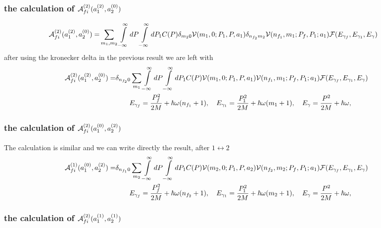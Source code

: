 \subsubsection{the calculation of $ {\cal A}_{fi}^{(2)}(a_1^{(2)}, a_2^{(0)})$}

\begin{align}
  {\cal A}_{fi}^{(2)}(a_1^{(2)}, a_2^{(0)}) = & \sum\limits_{m_1,m_2}\int\limits_{-\infty}^{\infty}dP\int\limits_{-\infty}^{\infty}dP_1 C(P)\delta_{m_20}{\cal V}(m_1,0;P_1,P,a_1)\delta_{n_{f_2}m_2}{\cal V}(n_{f_1},m_1;P_f,P_1;a_1){\cal F}(E_{\gamma_f},E_{\gamma_1},E_\gamma)
\end{align}
after using the kronecker delta in the previous result we are left with
\begin{align}
  {\cal A}_{fi}^{(2)}(a_1^{(2)}, a_2^{(0)}) = & \delta_{n_{f_2}0}\sum\limits_{m_1}\int\limits_{-\infty}^{\infty}dP\int\limits_{-\infty}^{\infty}dP_1 C(P){\cal V}(m_1,0;P_1,P,a_1){\cal V}(n_{f_1},m_1;P_f,P_1;a_1){\cal F}(E_{\gamma_f},E_{\gamma_1},E_\gamma)\nonumber \\
  & \qquad E_{\gamma_f} = \frac{P_f^2}{2M}+\hbar\omega(n_{f_1}+1),\quad E_{\gamma_1} = \frac{P_1^2}{2M}+\hbar\omega(m_{1}+1),\quad E_{\gamma} = \frac{P^2}{2M}+\hbar\omega,\quad
\end{align}

\subsubsection{the calculation of $ {\cal A}_{fi}^{(2)}(a_1^{(0)}, a_2^{(2)})$}
The calculation is similar and we can write directly the result, after $1\leftrightarrow2$
\begin{align}
  {\cal A}_{fi}^{(1)}(a_1^{(0)}, a_2^{(2)}) = & \delta_{n_{f_1}0}\sum\limits_{m_2}\int\limits_{-\infty}^{\infty}dP\int\limits_{-\infty}^{\infty}dP_1 C(P){\cal V}(m_2,0;P_1,P,a_2){\cal V}(n_{f_2},m_2;P_f,P_1;a_1){\cal F}(E_{\gamma_f},E_{\gamma_1},E_\gamma)\nonumber \\
  & \qquad E_{\gamma_f} = \frac{P_f^2}{2M}+\hbar\omega(n_{f_2}+1),\quad E_{\gamma_1} = \frac{P_1^2}{2M}+\hbar\omega(m_{2}+1),\quad E_{\gamma} = \frac{P^2}{2M}+\hbar\omega,\quad
\end{align}

\subsubsection{the calculation of $ {\cal A}_{fi}^{(2)}(a_1^{(1)}, a_2^{(1)})$}

